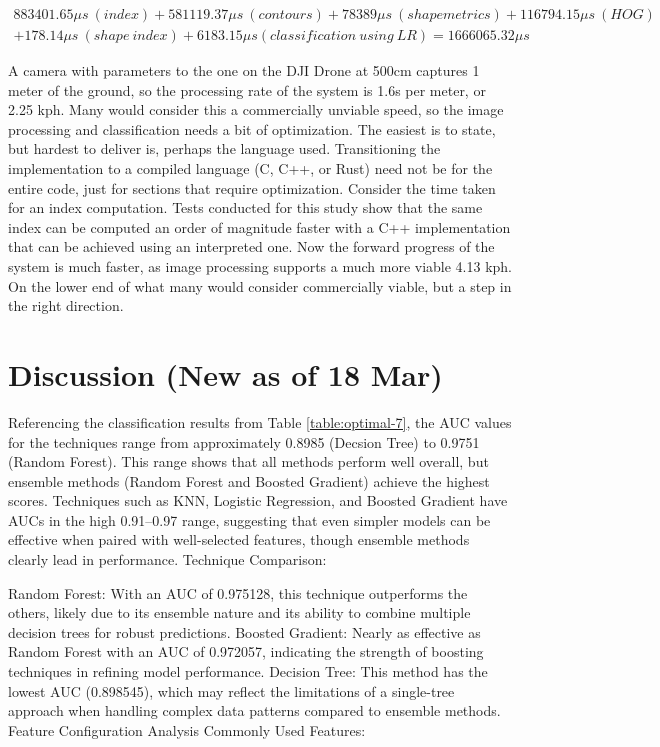 \documentclass[letterpaper]{report}
\begin{document}
\begin{multline}
883401.65 \mu s\ (index) + 581119.37 \mu s\  (contours) + 78389 \mu s\ (shape metrics) + 116794.15 \mu s\ (HOG) \\ + 178.14 \mu s\ (shape\ index) + 6183.15 \mu s (classification\ using\ LR) = 1666065.32 \mu s
\end{multline}

A camera with parameters to the one on the DJI Drone at 500cm captures 1 meter of the ground, so the processing rate of the system is 1.6s per meter, or 2.25 kph. Many would consider this a commercially unviable speed, so the image processing and classification needs a bit of optimization. The easiest is to state, but hardest to deliver is, perhaps the language used. Transitioning the implementation to a compiled language (C, C++, or Rust) need not be for the entire code, just for sections that require optimization. Consider the time taken for an index computation. Tests conducted for this study show that the same index can be computed an order of magnitude faster with a C++ implementation that can be achieved using an interpreted one. Now the forward progress of the system is much faster, as image processing supports a much more viable 4.13 kph. On the lower end of what many would consider commercially viable, but a step in the right direction.

\chapter{Discussion (New as of 18 Mar)}
\label{section:discussion}
Referencing the classification results from Table \ref{table:optimal-7}, the AUC values for the techniques range from approximately 0.8985 (Decsion Tree) to 0.9751 (Random Forest). This range shows that all methods perform well overall, but ensemble methods (Random Forest and Boosted Gradient) achieve the highest scores.
Techniques such as KNN, Logistic Regression, and Boosted Gradient have AUCs in the high 0.91–0.97 range, suggesting that even simpler models can be effective when paired with well-selected features, though ensemble methods clearly lead in performance.
Technique Comparison:

Random Forest: With an AUC of 0.975128, this technique outperforms the others, likely due to its ensemble nature and its ability to combine multiple decision trees for robust predictions.
Boosted Gradient: Nearly as effective as Random Forest with an AUC of 0.972057, indicating the strength of boosting techniques in refining model performance.
Decision Tree: This method has the lowest AUC (0.898545), which may reflect the limitations of a single-tree approach when handling complex data patterns compared to ensemble methods.
Feature Configuration Analysis
Commonly Used Features:
\end{document}
